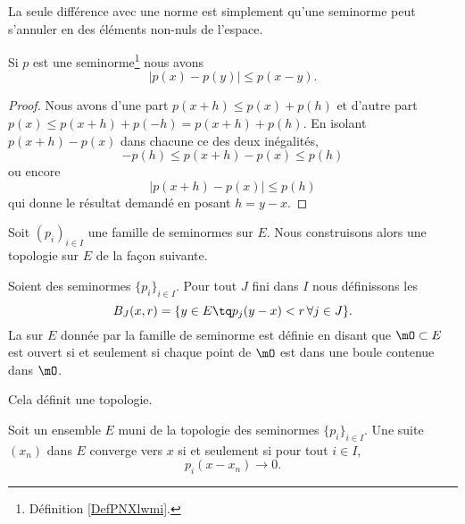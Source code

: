 La seule différence avec une norme est simplement qu'une seminorme peut s'annuler en des éléments non-nuls de l'espace.

\begin{lemma}
    Si \( p\) est une seminorme\footnote{Définition \ref{DefPNXlwmi}.} nous avons
    \begin{equation}
        | p(x)-p(y) |\leq p(x-y).
    \end{equation}
\end{lemma}

\begin{proof}
    Nous avons d'une part \( p(x+h)\leq p(x)+p(h)\) et d'autre part \( p(x)\leq p(x+h)+p(-h)=p(x+h)+p(h)\). En isolant \( p(x+h)-p(x)\) dans chacune ce des deux inégalités,
    \begin{equation}
        -p(h)\leq p(x+h)-p(x)\leq p(h)
    \end{equation}
    ou encore
    \begin{equation}
        |p(x+h)-p(x)|\leq p(h)
    \end{equation}
    qui donne le résultat demandé en posant \( h=y-x\).
\end{proof}

Soit \( (p_i)_{i\in I}\) une famille de seminormes sur \( E\). Nous construisons alors une topologie sur \( E\) de la façon suivante.

\begin{propositionDef}      \label{DEFooZTKAooWYUyDa}
    Soient des seminormes \( \{ p_i \}_{i\in I}\). Pour tout \( J\) fini dans \( I\) nous définissons les 
    \begin{equation}
        B_J(x,r)=\{ y\in E\tq p_j(y-x)<r\,\forall j\in J \}.
    \end{equation}
    La  sur \( E\) donnée par la famille de seminorme est définie en disant que \( \mO\subset E\) est ouvert si et seulement si chaque point de \( \mO\) est dans une boule contenue dans \( \mO\).

    Cela définit une topologie.
\end{propositionDef}

\begin{proposition} \label{PropQPzGKVk}
    Soit un ensemble \( E\) muni de la topologie des seminormes \( \{ p_i \}_{i\in I}\). Une suite \( (x_n)\) dans \( E\) converge vers \( x\) si et seulement si pour tout \( i\in I\),
    \begin{equation}
        p_i(x-x_n)\to 0.
    \end{equation}
\end{proposition}

